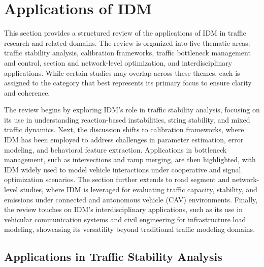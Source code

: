 \documentclass[a4paper,fleqn]{cas-sc}
\begin{document}
\section{Applications of IDM}
\label{sec:applications}
This section provides a structured review of the applications of IDM in traffic research and related domains. The review is organized into five thematic areas: traffic stability analysis, calibration frameworks, traffic bottleneck management and control, section and network-level optimization, and interdisciplinary applications. While certain studies may overlap across these themes, each is assigned to the category that best represents its primary focus to ensure clarity and coherence.

The review begins by exploring IDM's role in traffic stability analysis, focusing on its use in understanding reaction-based instabilities, string stability, and mixed traffic dynamics. Next, the discussion shifts to calibration frameworks, where IDM has been employed to address challenges in parameter estimation, error modeling, and behavioral feature extraction. Applications in bottleneck management, such as intersections and ramp merging, are then highlighted, with IDM widely used to model vehicle interactions under cooperative and signal optimization scenarios. The section further extends to road segment and network-level studies, where IDM is leveraged for evaluating traffic capacity, stability, and emissions under connected and autonomous vehicle (CAV) environments. Finally, the review touches on IDM's interdisciplinary applications, such as its use in vehicular communication systems and civil engineering for infrastructure load modeling, showcasing its versatility beyond traditional traffic modeling domains.

\subsection{Applications in Traffic Stability Analysis}
\end{document}
